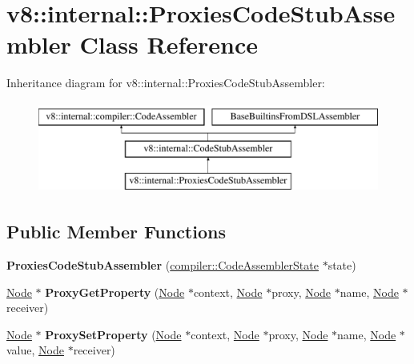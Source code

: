 \hypertarget{classv8_1_1internal_1_1ProxiesCodeStubAssembler}{}\section{v8\+:\+:internal\+:\+:Proxies\+Code\+Stub\+Assembler Class Reference}
\label{classv8_1_1internal_1_1ProxiesCodeStubAssembler}
Inheritance diagram for v8\+:\+:internal\+:\+:Proxies\+Code\+Stub\+Assembler\+:\begin{figure}[H]
\begin{center}
\leavevmode
\includegraphics[height=3.000000cm]{classv8_1_1internal_1_1ProxiesCodeStubAssembler}
\end{center}
\end{figure}
\subsection*{Public Member Functions}
\begin{DoxyCompactItemize}
\item 
\mbox{\label{classv8_1_1internal_1_1ProxiesCodeStubAssembler_a134508466518b81a7184d038abf568f0}} 
{\bfseries Proxies\+Code\+Stub\+Assembler} (\mbox{\hyperlink{classv8_1_1internal_1_1compiler_1_1CodeAssemblerState}{compiler\+::\+Code\+Assembler\+State}} $\ast$state)
\item 
\mbox{\label{classv8_1_1internal_1_1ProxiesCodeStubAssembler_ad2c09cc4c3faed1ecca093d7b4f3e410}} 
\mbox{\hyperlink{classv8_1_1internal_1_1compiler_1_1Node}{Node}} $\ast$ {\bfseries Proxy\+Get\+Property} (\mbox{\hyperlink{classv8_1_1internal_1_1compiler_1_1Node}{Node}} $\ast$context, \mbox{\hyperlink{classv8_1_1internal_1_1compiler_1_1Node}{Node}} $\ast$proxy, \mbox{\hyperlink{classv8_1_1internal_1_1compiler_1_1Node}{Node}} $\ast$name, \mbox{\hyperlink{classv8_1_1internal_1_1compiler_1_1Node}{Node}} $\ast$receiver)
\item 
\mbox{\label{classv8_1_1internal_1_1ProxiesCodeStubAssembler_aece69e7d337cca4196d9253ce230e952}} 
\mbox{\hyperlink{classv8_1_1internal_1_1compiler_1_1Node}{Node}} $\ast$ {\bfseries Proxy\+Set\+Property} (\mbox{\hyperlink{classv8_1_1internal_1_1compiler_1_1Node}{Node}} $\ast$context, \mbox{\hyperlink{classv8_1_1internal_1_1compiler_1_1Node}{Node}} $\ast$proxy, \mbox{\hyperlink{classv8_1_1internal_1_1compiler_1_1Node}{Node}} $\ast$name, \mbox{\hyperlink{classv8_1_1internal_1_1compiler_1_1Node}{Node}} $\ast$value, \mbox{\hyperlink{classv8_1_1internal_1_1compiler_1_1Node}{Node}} $\ast$receiver)
\end{DoxyCompactItemize}
